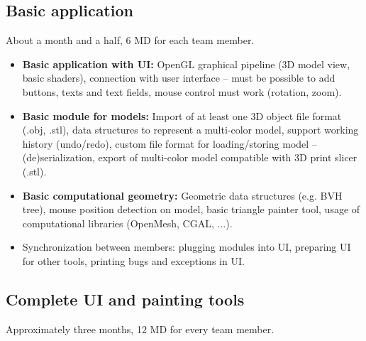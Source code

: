 \subsection{Basic application}

About a month and a half, 6 MD for each team member.

\begin{itemize}
\item \textbf{Basic application with UI:} OpenGL graphical pipeline (3D model view, basic shaders), connection with user interface -- must be possible to add buttons, texts and text fields, mouse control must work (rotation, zoom).
\item \textbf{Basic module for models:} Import of at least one 3D object file format (.obj, .stl), data structures to represent a multi-color model, support working history (undo/redo), custom file format for loading/storing model -- (de)serialization, export of multi-color model compatible with 3D print slicer (.stl).
\item \textbf{Basic computational geometry:} Geometric data structures (e.g. BVH tree), mouse position detection on model, basic triangle painter tool, usage of computational libraries (OpenMesh, CGAL, ...).
\item Synchronization between members: plugging modules into UI, preparing UI for other tools, printing bugs and exceptions in UI.
\end{itemize}


\subsection{Complete UI and painting tools}

Approximately three months, 12 MD for every team member.

